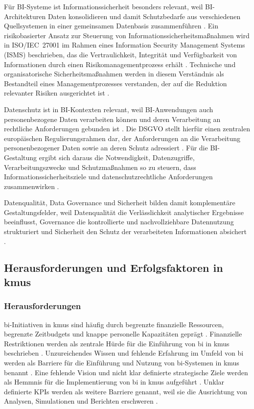 Für BI-Systeme ist Informationssicherheit besonders relevant, weil BI-Architekturen Daten konsolidieren und damit Schutzbedarfe aus verschiedenen Quellsystemen in einer gemeinsamen Datenbasis zusammenführen \cite{BaarsKemper2021}. Ein risikobasierter Ansatz zur Steuerung von Informationssicherheitsmaßnahmen wird in ISO/IEC~27001 im Rahmen eines Information Security Management Systems (ISMS) beschrieben, das die Vertraulichkeit, Integrität und Verfügbarkeit von Informationen durch einen Risikomanagementprozess erhält \cite{ISO27001}. Technische und organisatorische Sicherheitsmaßnahmen werden in diesem Verständnis als Bestandteil eines Managementprozesses verstanden, der auf die Reduktion relevanter Risiken ausgerichtet ist \cite{ISO27001}. 

Datenschutz ist in BI-Kontexten relevant, weil BI-Anwendungen auch personenbezogene Daten verarbeiten können und deren Verarbeitung an rechtliche Anforderungen gebunden ist \cite{GDPR_EURLex}. Die DSGVO stellt hierfür einen zentralen europäischen Regulierungsrahmen dar, der Anforderungen an die Verarbeitung personenbezogener Daten sowie an deren Schutz adressiert \cite{GDPR_EURLex}. Für die BI-Gestaltung ergibt sich daraus die Notwendigkeit, Datenzugriffe, Verarbeitungszwecke und Schutzmaßnahmen so zu steuern, dass Informationssicherheitsziele und datenschutzrechtliche Anforderungen zusammenwirken \cite{ISO27001,GDPR_EURLex}. 

Datenqualität, Data Governance und Sicherheit bilden damit komplementäre Gestaltungsfelder, weil Datenqualität die Verlässlichkeit analytischer Ergebnisse beeinflusst, Governance die kontrollierte und nachvollziehbare Datennutzung strukturiert und Sicherheit den Schutz der verarbeiteten Informationen absichert \cite{WangStrong1996,KhatriBrown2010,ISO27001}. 


\subsection{Herausforderungen und Erfolgsfaktoren in \glspl{kmu}}

\subsubsection{Herausforderungen}
\gls{bi}-Initiativen in \glspl{kmu} sind häufig durch begrenzte finanzielle Ressourcen, begrenzte Zeitbudgets und knappe personelle Kapazitäten geprägt \cite{BianchiniMichalkova2019}. Finanzielle Restriktionen werden als zentrale Hürde für die Einführung von \gls{bi} in \glspl{kmu} beschrieben \cite{TaticDzaficHaracic2018}. 
Unzureichendes Wissen und fehlende Erfahrung im Umfeld von \gls{bi} werden als Barriere für die Einführung und Nutzung von \gls{bi}-Systemen in \glspl{kmu} benannt \cite{TaticDzaficHaracic2018}. Eine fehlende Vision und nicht klar definierte strategische Ziele werden als Hemmnis für die Implementierung von \gls{bi} in \glspl{kmu} aufgeführt \cite{TaticDzaficHaracic2018}. Unklar definierte KPIs werden als weitere Barriere genannt, weil sie die Ausrichtung von Analysen, Simulationen und Berichten erschweren \cite{TaticDzaficHaracic2018}. 

